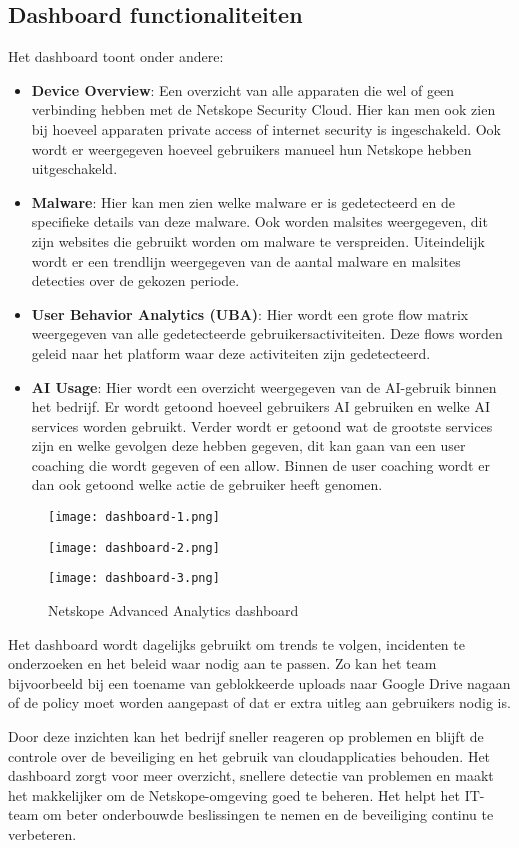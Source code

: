 \subsection{Dashboard functionaliteiten}
Het dashboard toont onder andere:
\begin{itemize}
    \item \textbf{Device Overview}: Een overzicht van alle apparaten die wel of geen verbinding hebben met de Netskope Security Cloud. Hier kan men ook zien bij hoeveel apparaten private access of internet security is ingeschakeld. Ook wordt er weergegeven hoeveel gebruikers manueel hun Netskope hebben uitgeschakeld.
    \item \textbf{Malware}: Hier kan men zien welke malware er is gedetecteerd en de specifieke details van deze malware. Ook worden malsites weergegeven, dit zijn websites die gebruikt worden om malware te verspreiden. Uiteindelijk wordt er een trendlijn weergegeven van de aantal malware en malsites detecties over de gekozen periode.
    \item \textbf{User Behavior Analytics (UBA)}: Hier wordt een grote flow matrix weergegeven van alle gedetecteerde gebruikersactiviteiten. Deze flows worden geleid naar het platform waar deze activiteiten zijn gedetecteerd.
    \item \textbf{AI Usage}: Hier wordt een overzicht weergegeven van de AI-gebruik binnen het bedrijf. Er wordt getoond hoeveel gebruikers AI gebruiken en welke AI services worden gebruikt. Verder wordt er getoond wat de grootste services zijn en welke gevolgen deze hebben gegeven, dit kan gaan van een user coaching die wordt gegeven of een allow. Binnen de user coaching wordt er dan ook getoond welke actie de gebruiker heeft genomen.
\end{itemize}

\begin{figure}[h!]
    \centering
    \texttt{[image: dashboard-1.png]}
    \label{fig:dashboard-1}
\end{figure}
\begin{figure}[h!]
    \centering
    \texttt{[image: dashboard-2.png]}
    \label{fig:dashboard-2}
\end{figure}
\begin{figure}[h!]
    \centering
    \texttt{[image: dashboard-3.png]}
    \caption[]{Netskope Advanced Analytics dashboard}
    \label{fig:dashboard-3}
\end{figure}

Het dashboard wordt dagelijks gebruikt om trends te volgen, incidenten te onderzoeken en het beleid waar nodig aan te passen. Zo kan het team bijvoorbeeld bij een toename van geblokkeerde uploads naar Google Drive nagaan of de policy moet worden aangepast of dat er extra uitleg aan gebruikers nodig is.

Door deze inzichten kan het bedrijf sneller reageren op problemen en blijft de controle over de beveiliging en het gebruik van cloudapplicaties behouden. Het dashboard zorgt voor meer overzicht, snellere detectie van problemen en maakt het makkelijker om de Netskope-omgeving goed te beheren. Het helpt het IT-team om beter onderbouwde beslissingen te nemen en de beveiliging continu te verbeteren.